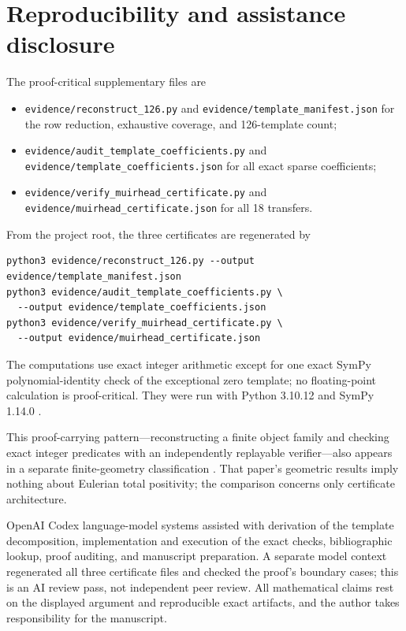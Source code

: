 \documentclass[11pt]{article}
\begin{document}
\section{Reproducibility and assistance disclosure}

The proof-critical supplementary files are
\begin{itemize}
\item \texttt{evidence/reconstruct\_126.py} and
      \texttt{evidence/template\_manifest.json} for the row reduction,
      exhaustive coverage, and 126-template count;
\item \texttt{evidence/audit\_template\_coefficients.py} and
      \texttt{evidence/template\_coefficients.json} for all exact sparse
      coefficients;
\item \texttt{evidence/verify\_muirhead\_certificate.py} and
      \texttt{evidence/muirhead\_certificate.json} for all 18 transfers.
\end{itemize}
From the project root, the three certificates are regenerated by
\begin{verbatim}
python3 evidence/reconstruct_126.py --output evidence/template_manifest.json
python3 evidence/audit_template_coefficients.py \
  --output evidence/template_coefficients.json
python3 evidence/verify_muirhead_certificate.py \
  --output evidence/muirhead_certificate.json
\end{verbatim}
The computations use exact integer arithmetic except for one exact SymPy
polynomial-identity check of the exceptional zero template; no floating-point
calculation is proof-critical.  They were run with Python 3.10.12 and SymPy
1.14.0 \cite{MeurerEtAl2017}.

This proof-carrying pattern---reconstructing a finite object family and checking
exact integer predicates with an independently replayable verifier---also
appears in a separate finite-geometry classification \cite{202608.1658}.
That paper's geometric results imply nothing about Eulerian total positivity;
the comparison concerns only certificate architecture.

OpenAI Codex language-model systems assisted with derivation of the template
decomposition, implementation and execution of the exact checks,
bibliographic lookup, proof auditing, and manuscript preparation.  A separate
model context regenerated all three certificate files and checked the proof's
boundary cases; this is an AI review pass, not independent peer review.  All
mathematical claims rest on the displayed argument and reproducible exact
artifacts, and the author takes responsibility for the manuscript.



\end{document}
